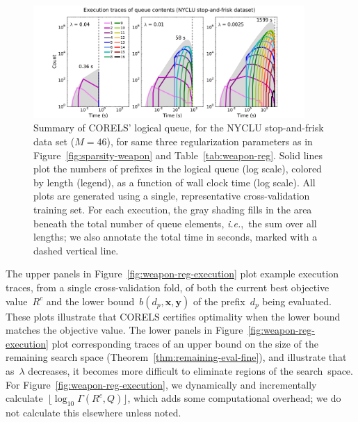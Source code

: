 \documentclass[twoside,11pt]{article}
\def\ie{{\it i.e.},~}
\newcommand{\x}{\mathbf{x}}
\newcommand{\y}{\mathbf{y}}
\def\Prefix{d_p}
\def\Reg{{\lambda}}
\def\CurrentObj{{R^c}}
\def\Remaining{\Gamma}
\def\Queue{Q}
\begin{document}
\begin{figure}[t!]
\begin{center}
\includegraphics[trim={30mm 0mm 30mm 3mm},
width=0.92\textwidth]{figs/weapon_reg-queue.pdf}
\end{center}
\vspace{-5mm}
\caption{Summary of CORELS' logical queue,
for the NYCLU stop-and-frisk data set (${M = 46}$),
for same three regularization parameters as in Figure~\ref{fig:sparsity-weapon}
and Table~\ref{tab:weapon-reg}.
%
Solid lines plot the numbers of prefixes in the logical queue (log scale), colored by length (legend),
as a function of wall clock time (log scale).
%
All plots are generated using a single, representative cross-validation training set.
%
For each execution, the gray shading fills in the area beneath the total number
of queue elements, \ie the sum over all lengths;
we also annotate the total time in seconds, marked with a dashed vertical line.
}
\label{fig:queue-weapon-reg}
\end{figure}

The upper panels in Figure~\ref{fig:weapon-reg-execution} plot example execution traces,
from a single cross-validation fold, of both the current best objective value~$\CurrentObj$
and the lower bound~$b(\Prefix, \x, \y)$ of the prefix~$\Prefix$ being evaluated.
%
These plots illustrate that CORELS certifies optimality
when the lower bound matches the objective value.
%
The lower panels in Figure~\ref{fig:weapon-reg-execution} plot corresponding traces of
an upper bound on the size of the remaining search space (Theorem~\ref{thm:remaining-eval-fine}),
and illustrate that as~$\Reg$ decreases, it becomes more difficult to eliminate regions of the search~space.
%
For Figure~\ref{fig:weapon-reg-execution}, we dynamically and incrementally
calculate~$\lfloor \log_{10} \Remaining(\CurrentObj, \Queue) \rfloor$,
which adds some computational overhead; we do not calculate this elsewhere unless noted.
\end{document}
